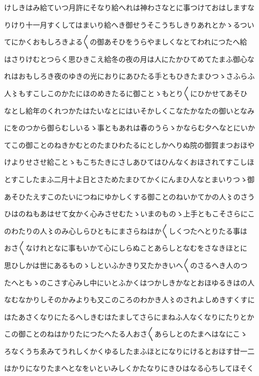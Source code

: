 \documentclass[a4paper,11pt,landscape]{ltjtarticle}
\begin{document}
けしきはみ給ていつ月許にそなり給へれは神わさなとに事つけておはしますな
\par\medskip
りけり十一月すくしてはまいり給へき御せうそこうちしきりあれとかゝるつい
\par\medskip
てにかくおもしろきよる〱の御あそひをうらやましくなとてわれにつたへ給
\par\medskip
はさりけむとつらく思ひきこえ給冬の夜の月は人にたかひてめてたまふ御心な
\par\medskip
れはおもしろき夜のゆきの光におりにあひたる手ともひきたまひつゝさふらふ
\par\medskip
人〻もすこしこのかたにほのめきたるに御ことゝもとり〱にひかせてあそひ
\par\medskip
なとし給年のくれつかたはたいなとにはいそかしくこなたかなたの御いとなみ
\par\medskip
にをのつから御らむしいるゝ事ともあれは春のうらゝかならむ夕へなとにいか
\par\medskip
てこの御ことのねきかむとのたまひわたるにとしかへりぬ院の御賀まつおほや
\par\medskip
けよりせさせ給ことゝもこちたきにさしあひてはひんなくおほされてすこしほ
\par\medskip
とすこしたまふ二月十よ日とさためたまひてかくにんまひ人なとまいりつゝ御
\par\medskip
あそひたえすこのたいにつねにゆかしくする御ことのねいかてかの人〻のさう
\par\medskip
ひはのねもあはせて女かく心みさせむたゝいまのものゝ上手ともこそさらにこ
\par\medskip
のわたりの人〻のみ心しらひともにまさらねはか〱しくつたへとりたる事は
\par\medskip
おさ〱なけれとなに事もいかて心にしらぬことあらしとなむをさなきほとに
\par\medskip
思ひしかは世にあるものゝしといふかきり又たかきいへ〱のさるへき人のつ
\par\medskip
たへともゝのこさす心みし中にいとふかくはつかしきかなとおほゆるきはの人
\par\medskip
なむなかりしそのかみよりも又このころのわかき人〻のされよしめきすくすに
\par\medskip
はたあさくなりにたるへしきむはたましてさらにまねふ人なくなりにたりとか
\par\medskip
この御ことのねはかりたにつたへたる人おさ〱あらしとのたまへはなにこゝ
\par\medskip
ろなくうちゑみてうれしくかくゆるしたまふほとになりにけるとおほす廿一二
\par\medskip
はかりになりたまへとなをいといみしくかたなりにきひはなる心ちしてほそく
\end{document}
